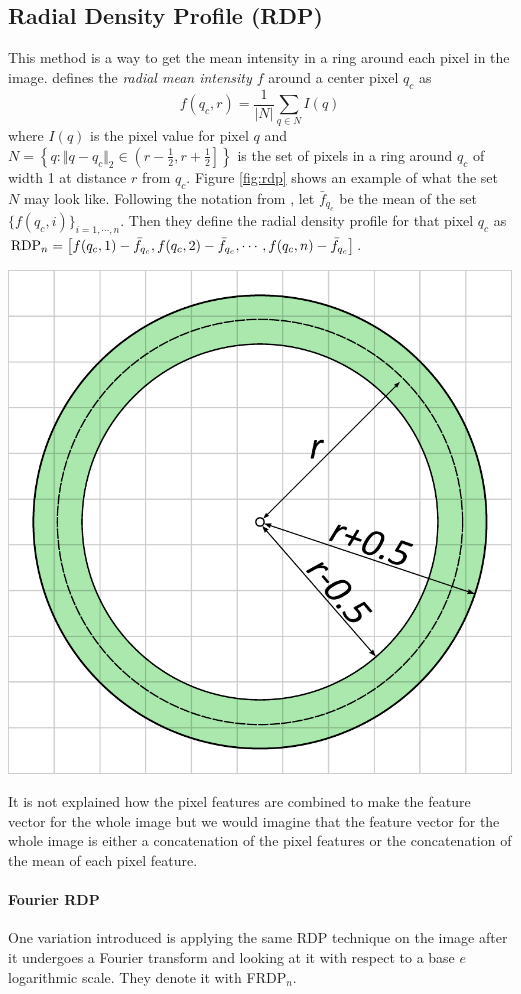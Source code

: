 \begin{multicols}{2}
\subsection{Radial Density Profile (RDP)}
This method is a way to get the mean intensity in a ring around each pixel in the image. \citet{kylberg2011virus} defines the \emph{radial mean intensity $f$} around a center pixel $q_c$ as 
\[ f(q_c, r) = \frac{1}{|N|} \sum\limits_{q\in N} I(q) \]
where $I(q)$ is the pixel value for pixel $q$ and $N = \left\{ q: \Vert q-q_c \Vert_2 \in \left( r-\frac{1}{2}, r+\frac{1}{2} \right] \right\}$ is the set of pixels in a ring around $q_c$ of width 1 at distance $r$ from $q_c$. Figure \ref{fig:rdp} shows an example of what the set $N$ may look like. Following the notation from \citet{kylberg2011virus}, let $\bar{f}_{q_c}$ be the mean of the set $\{ f(q_c,i) \}_{i = 1, \cdots, n}$. Then they define the radial density profile for that pixel $q_c$ as $\textnormal{RDP}_n = \left[ f(q_c,1)-\bar{f}_{q_c}, f(q_c, 2)-\bar{f}_{q_c}, \cdots, f(q_c,n)-\bar{f}_{q_c} \right]$. 
\begin{Figure}
	\centering
	\includegraphics[width=0.5\linewidth]{images/rdp.pdf}
	\label{fig:rdp}
\end{Figure}
\par It is not explained how the pixel features are combined to make the feature vector for the whole image but we would imagine that the feature vector for the whole image is either a concatenation of the pixel features or the concatenation of the mean of each pixel feature. 
\paragraph{Fourier RDP} One variation \citet{kylberg2011virus} introduced is applying the same RDP technique on the image after it undergoes a Fourier transform and looking at it with respect to a base $e$ logarithmic scale. They denote it with FRDP$_n$.


\end{multicols}
